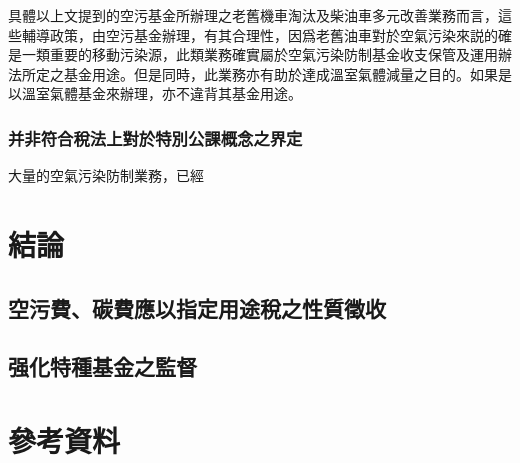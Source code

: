 \documentclass[12pt,a4paper]{article}
\begin{document}
具體以上文提到的空污基金所辦理之老舊機車淘汰及柴油車多元改善業務而言，這些輔導政策，由空污基金辦理，有其合理性，因爲老舊油車對於空氣污染來説的確是一類重要的移動污染源，此類業務確實屬於空氣污染防制基金收支保管及運用辦法所定之基金用途。但是同時，此業務亦有助於達成溫室氣體減量之目的。如果是以溫室氣體基金來辦理，亦不違背其基金用途。


\subsubsection{并非符合稅法上對於特別公課概念之界定}

大量的空氣污染防制業務，已經



\section{結論}


\subsection{空污費、碳費應以指定用途稅之性質徵收}
\subsection{强化特種基金之監督}




\pagebreak
\nocite{*}




\section*{參考資料}



\printbibliography[type=book, title={專書}]

\printbibliography[type=article, title={期刊文章}]

\printbibliography[type=thesis,title={學位論文}]

\printbibliography[type=立法院,title={立法院報告}]

\printbibliography[keyword=news,title={新聞}]

\printbibliography[nottype=book,nottype=article,nottype=thesis,title={網路資料}]






\end{document}
